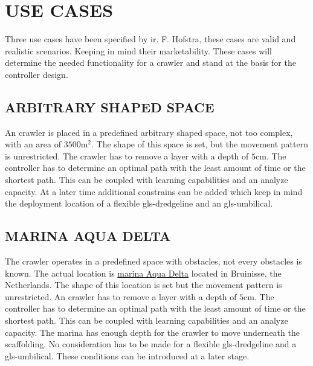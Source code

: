 \section{USE CASES}\label{sec:usecases}
Three use cases have been specified by ir. F. Hofstra, these cases are valid and realistic scenarios. Keeping in
mind their marketability. These cases will determine the needed functionality for a crawler and stand at the basis
for the controller design.

\subsection{ARBITRARY SHAPED SPACE}\label{sec:usecase1}
An crawler is placed in a predefined arbitrary shaped space, not too complex, with an area of \( 3500
\si{\square\metre} \). The shape of this space is set, but the movement pattern is unrestricted. The crawler has to
remove a layer with a depth of \( 5 \si{\cm} \). The controller has to determine an optimal path with the least
amount of time or the shortest path. This can be coupled with learning capabilities and an analyze capacity. At a
later time additional constrains can be added which keep in mind the deployment location of a flexible
\gls{gls-dredgeline} and an \gls{gls-umbilical}.

\subsection{MARINA AQUA DELTA}\label{sec:usecase2}
The crawler operates in a predefined space with obstacles, not every obstacles is known. The actual location is
\href{https://www.google.nl/maps/place/Jachthaven+Bruinisse/@51.6712838,4.0824101,
15z/data=!4m2!3m1!1s0x0:0x9c840ab80bde39c8}{marina Aqua Delta} located in Bruinisse, the Netherlands. The shape of
this location is set but the movement pattern is unrestricted. An crawler has to remove a layer with a depth of \( 5
\si{\cm} \). The controller has to determine an optimal path with the least amount of time or the shortest path. This
can be coupled with learning capabilities and an analyze capacity. The marina has enough depth for the crawler to
move underneath the scaffolding. No consideration has to be made for a flexible \gls{gls-dredgeline} and a 
\gls{gls-umbilical}. These conditions can be introduced at a later stage.

